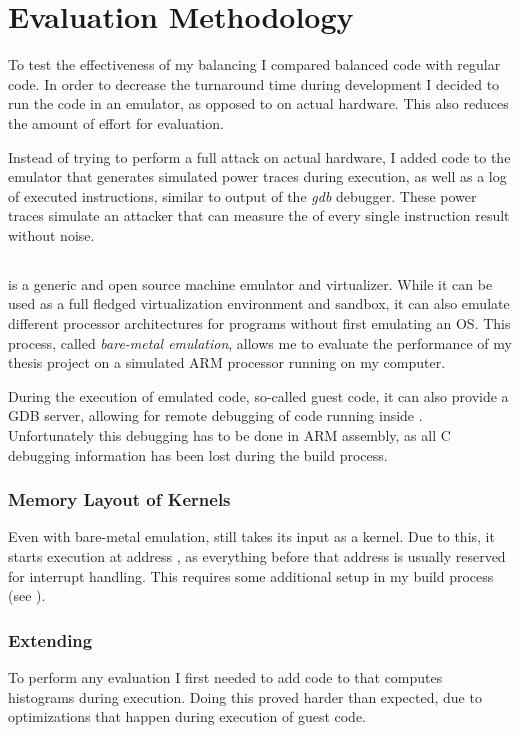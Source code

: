 \chapter{Evaluation Methodology}
\label{evaluation}
To test the effectiveness of my balancing I compared balanced code with regular code.
In order to decrease the turnaround time during development I decided to run the code in an emulator, as opposed to on actual hardware.
This also reduces the amount of effort for evaluation.

Instead of trying to perform a full \poweranalysis{} attack on actual hardware, I added code to the \qemu{} emulator that generates simulated power traces during execution, as well as a log of executed instructions, similar to output of the \emph{gdb} debugger.
These power traces simulate an attacker that can measure the \hammingw{} of every single instruction result without noise.

\section{\qemu{}}
\qemu{} is a generic and open source machine emulator and virtualizer.\cite{bellard2005qemu}
While it can be used as a full fledged virtualization environment and sandbox, it can also emulate different processor architectures for programs without first emulating an OS.
This process, called \emph{bare-metal emulation}, allows me to evaluate the performance of my thesis project on a simulated ARM processor running on my computer.

During the execution of emulated code, so-called guest code, it can also provide a GDB server, allowing for remote debugging of code running inside \qemu{}.
Unfortunately this debugging has to be done in ARM assembly, as all C debugging information has been lost during the build process.

\subsection{Memory Layout of \qemu{} Kernels}
\label{memory}
Even with bare-metal emulation, \qemu{} still takes its input as a kernel.
Due to this, it starts execution at address , as everything before that address is usually reserved for interrupt handling.
This requires some additional setup in my build process (see ).

\subsection{Extending \qemu{}}
To perform any evaluation I first needed to add code to \qemu{} that computes \hammingw{} histograms during execution.
Doing this proved harder than expected, due to optimizations that happen during execution of guest code.

